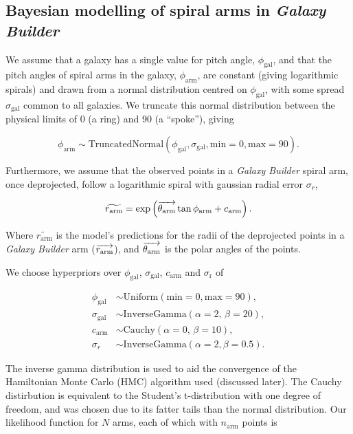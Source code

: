 \subsection{Bayesian modelling of spiral arms in \textit{Galaxy Builder}}

We assume that a galaxy has a single value for pitch angle, $\phi_\mathrm{gal}$, and that the pitch angles of spiral arms in the galaxy, $\phi_\mathrm{arm}$, are constant (giving logarithmic spirals) and drawn from a normal distribution centred on $\phi_\mathrm{gal}$, with some spread $\sigma_\mathrm{gal}$ common to all galaxies. We truncate this normal distribution between the physical limits of {0\degree} (a ring) and {90\degree} (a ``spoke''), giving

\begin{equation}
\phi_\mathrm{arm} \sim \mathrm{TruncatedNormal}(\phi_\mathrm{gal}, \sigma_\mathrm{gal}, \mathrm{min}=0, \mathrm{max}=90).
\end{equation}

Furthermore, we assume that the observed points in a \textit{Galaxy Builder} spiral arm, once deprojected, follow a logarithmic spiral with gaussian radial error $\sigma_r$,

\begin{equation}
\widetilde{r_\mathrm{arm}} = \exp\left(\overrightarrow{\theta_\mathrm{arm}}\tan\phi_\mathrm{arm} + c_\mathrm{arm}\right).
\end{equation}

Where $\widetilde{r_\mathrm{arm}}$ is the model's predictions for the radii of the deprojected points in a \textit{Galaxy Builder} arm ($\overrightarrow{r_\mathrm{arm}}$), and $\overrightarrow{\theta_\mathrm{arm}}$ is the polar angles of the points.

We choose hyperpriors over $\phi_\mathrm{gal}$, $\sigma_\mathrm{gal}$, $c_\mathrm{arm}$ and $\sigma_\mathrm{r}$ of

\begin{align}
  \phi_\mathrm{gal} &\sim \mathrm{Uniform}(\mathrm{min}=0, \mathrm{max}=90),\\
  \sigma_\mathrm{gal} &\sim \mathrm{InverseGamma}(\alpha=2,\,\beta=20),\\
  c_\mathrm{arm} &\sim \mathrm{Cauchy}(\alpha=0,\,\beta=10),\\
  \sigma_r &\sim \mathrm{InverseGamma}(\alpha=2, \beta=0.5).
\end{align}

The inverse gamma distribution is used to aid the convergence of the Hamiltonian Monte Carlo (HMC) algorithm used (discussed later). The Cauchy distirbution is equivalent to the Student's t-distribution with one degree of freedom, and was chosen due to its fatter tails than the normal distribution. Our likelihood function for $N$ arms, each of which with $n_\mathrm{arm}$ points is

